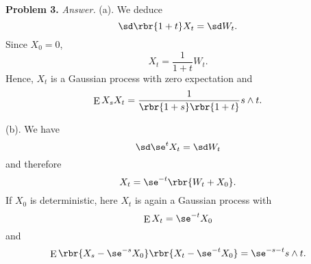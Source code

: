 \documentclass[english, nochinese]{pnote}
\DeclareMathOperator\ope{\mathrm{E}}
\begin{document}
\textbf{Problem 3.} \textit{Answer.} (a). We deduce
\begin{equation}
\sd \rbr{ 1 + t } X_t = \sd W_t.
\end{equation}
Since $ X_0 = 0 $,
\begin{equation}
X_t = \frac{1}{ 1 + t } W_t.
\end{equation}
Hence, $X_t$ is a Gaussian process with zero expectation and
\begin{equation}
\ope X_s X_t = \frac{1}{ \rbr{ 1 + s } \rbr{ 1 + t } } s \wedge t.
\end{equation}

(b). We have
\begin{equation}
\sd \se^t X_t = \sd W_t
\end{equation}
and therefore
\begin{equation}
X_t = \se^{-t} \rbr{ W_t + X_0 }.
\end{equation}
If $X_0$ is deterministic, here $X_t$ is again a Gaussian process with
\begin{equation}
\ope X_t = \se^{-t} X_0
\end{equation}
and
\begin{equation}
\ope \rbr{ X_s - \se^{-s} X_0 } \rbr{ X_t - \se^{-t} X_0 } = \se^{ -s - t } s \wedge t.
\end{equation}
\end{document}
